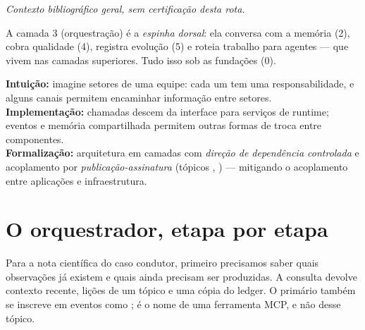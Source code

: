 \noindent\textit{Contexto bibliográfico geral, sem certificação desta rota.} 




\begin{conceito}
A camada 3 (orquestração) é a \emph{espinha dorsal}: ela conversa com a memória
(2), cobra qualidade (4), registra evolução (5) e roteia trabalho para agentes —
que vivem nas camadas superiores. Tudo isso sob as fundações (0).
\end{conceito}

\begin{niveis}
\textbf{Intuição:} imagine setores de uma equipe: cada um tem uma responsabilidade,
e alguns canais permitem encaminhar informação entre setores.\\
\textbf{Implementação:} chamadas descem da interface para serviços de runtime;
eventos e memória compartilhada permitem outras formas de troca entre componentes.\\
\textbf{Formalização:} arquitetura em camadas com \emph{direção de dependência controlada} e
acoplamento por \emph{publicação-assinatura} (tópicos \allowbreak,
\allowbreak) — mitigando o acoplamento entre
aplicações e infraestrutura.
\end{niveis}

\section{O orquestrador, etapa por etapa}


\begin{descricao}
Para a nota científica do caso condutor, primeiro precisamos saber quais
observações já existem e quais ainda precisam ser produzidas. A consulta
 devolve contexto recente, lições de um tópico e uma cópia do
ledger. O primário também se inscreve em eventos como ;
 é o nome de uma ferramenta MCP, e não desse tópico.
\end{descricao}


